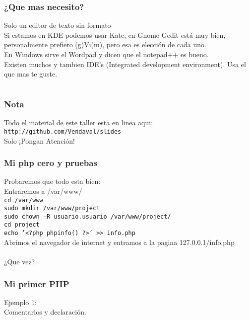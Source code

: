\documentclass[]{beamer}
\begin{document}
\begin{frame}\frametitle{¿Que mas necesito?}
Solo un editor de texto sin formato \\
Si estamos en KDE podemos usar Kate, en Gnome Gedit está muy bien, personalmente prefiero (g)Vi(m), pero esa es elección de cada uno. \\   
En Windows sirve el Wordpad y dicen que el notepad++ es bueno. \\
Existen muchos y tambien IDE's (Integrated development environment). Usa el que mas te guste. \\
\end{frame}

\section[PHP]{}
\begin{frame}\frametitle{Nota}
Todo el material de este taller esta en linea aqui: \\
\texttt{http://github.com/Vendaval/slides} \\
\alert{Solo ¡Pongan Atención!} \\
\end{frame}


\begin{frame}\frametitle{Mi php cero y pruebas}
Probaremos que todo esta bien: \\
Entraremos a /var/www/ \\
\texttt{cd /var/www} \\
\texttt{sudo mkdir /var/www/project} \\
\texttt{sudo chown -R usuario.usuario /var/www/project/} \\
\texttt{cd project}\\
\texttt{echo '<?php phpinfo() ?>' >> info.php} \\

Abrimos el navegador de internet y entramos a la pagina 127.0.0.1/info.php \\
\\
¿Que vez? \\

\end{frame}

\begin{frame}\frametitle{Mi primer PHP}
Ejemplo 1: \\
Comentarios y declaración.\\
\end{frame}
\end{document}
